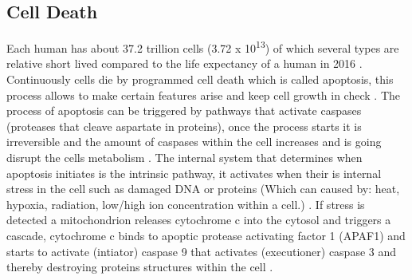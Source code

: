 \subsection{Cell Death}
Each human has about 37.2 trillion cells (3.72 x 10\textsuperscript{13}) \cite{} of which several types are relative short lived \cite{} compared to the life expectancy of a human in 2016 \cite{}. 
Continuously cells die by programmed cell death which is called apoptosis, this process allows to make certain features arise and keep cell growth in check \cite{}.
The process of apoptosis can be triggered by pathways that activate caspases (proteases that cleave aspartate in proteins), once the process starts it is irreversible and the amount of caspases within the cell increases and is going disrupt the cells metabolism \cite{}.
The internal system that determines when apoptosis initiates is the intrinsic pathway, it activates when their is internal stress in the cell such as damaged DNA or proteins (Which can caused by: heat, hypoxia, radiation, low/high ion concentration within a cell.)  \cite{}. 
If stress is detected a mitochondrion releases cytochrome c into the cytosol and triggers a cascade, cytochrome c binds to apoptic protease activating factor 1 (APAF1) and starts to activate (intiator) caspase 9 that activates (executioner) caspase 3 and thereby destroying proteins structures within the cell \cite{}. 

